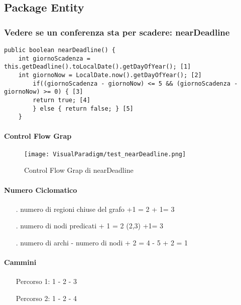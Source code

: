 \subsection{Package Entity}
\label{sec:test_strutturale_package_entity}

\subsubsection{Vedere se un conferenza sta per scadere: nearDeadline}
\begin{lstlisting}
public boolean nearDeadline() {
	int giornoScadenza = this.getDeadline().toLocalDate().getDayOfYear(); [1]
	int giornoNow = LocalDate.now().getDayOfYear(); [2]
        if((giornoScadenza - giornoNow) <= 5 && (giornoScadenza - giornoNow) >= 0) { [3]
	    return true; [4]
        } else { return false; } [5]
    }
\end{lstlisting}
\paragraph{Control Flow Grap}
\begin{figure}[ht]
  \centering
  \texttt{[image: VisualParadigm/test\_nearDeadline.png]}
  \caption{Control Flow Grap di nearDeadline}
  \label{fig:cfg_nearDeadline}
\end{figure}
\paragraph{Numero Ciclomatico}
\begin{itemize}
\item[.] numero di regioni chiuse del grafo +1 = 2 + 1= 3 
\item[.] numero di nodi predicati + 1 = 2 (2,3) +1= 3
\item[.] numero di archi - numero di nodi + 2 = 4 - 5 + 2 = 1 
\end{itemize}
\paragraph{Cammini}
\begin{itemize}
\item[Percorso 1:] 1 - 2 - 3
\item[Percorso 2:] 1 - 2 - 4
\end{itemize}
